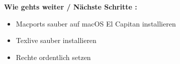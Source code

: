 %
%
%
%



\newpage

\textbf{Wie gehts weiter / Nächste Schritte :}
\begin{itemize}
  \item Macports sauber auf macOS El Capitan installieren
  \item Texlive sauber installieren
  \item Rechte ordentlich setzen
\end{itemize}

